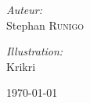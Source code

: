 \begin{titlepage}
\begin{minipage}{0.4\textwidth}
\begin{flushleft} \large
\emph{Auteur:}\\
Stephan \textsc{Runigo}
\end{flushleft}
\end{minipage}
\begin{minipage}{0.4\textwidth}
\begin{flushright} \large
\emph{Illustration:}\\
Krikri
\end{flushright}
\end{minipage}

\vfill

{\large \today}

\end{titlepage}
